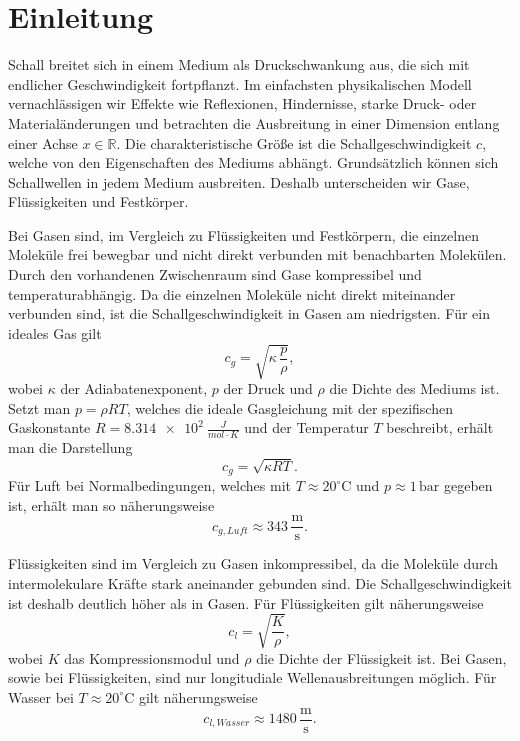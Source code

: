 %
%
%
%
\section{Einleitung\label{schall:section:teil0}}

Schall breitet sich in einem Medium als Druckschwankung aus, die sich mit endlicher Geschwindigkeit fortpflanzt.
Im einfachsten physikalischen Modell vernachlässigen wir Effekte wie Reflexionen, Hindernisse, starke Druck- oder Materialänderungen und betrachten die Ausbreitung in einer Dimension entlang einer Achse $x \in \mathbb{R}$.
Die charakteristische Größe ist die Schallgeschwindigkeit $c$, welche von den Eigenschaften des Mediums abhängt.
Grundsätzlich können sich Schallwellen in jedem Medium ausbreiten.
Deshalb unterscheiden wir Gase, Flüssigkeiten und Festkörper.

Bei Gasen sind, im Vergleich zu Flüssigkeiten und Festkörpern, die einzelnen Moleküle frei bewegbar und nicht direkt verbunden mit benachbarten Molekülen.
Durch den vorhandenen Zwischenraum sind Gase kompressibel und temperaturabhängig.
Da die einzelnen Moleküle nicht direkt miteinander verbunden sind, ist die Schallgeschwindigkeit in Gasen am niedrigsten.
Für ein ideales Gas gilt
\begin{equation}
    c_{g} = \sqrt{\kappa \, \frac{p}{\rho}},
\end{equation}
wobei $\kappa$ der Adiabatenexponent, $p$ der Druck und $\rho$ die Dichte des Mediums ist.
Setzt man $p = \rho R T$, welches die ideale Gasgleichung mit der spezifischen Gaskonstante $R = \SI{8.314e2}{\frac{J}{mol \cdot K}}$ und der Temperatur $T$ beschreibt, erhält man die Darstellung
\begin{equation}
    c_{g} = \sqrt{\kappa R T}.
\end{equation}
Für Luft bei Normalbedingungen, welches mit $T \approx 20^\circ \mathrm{C}$ und $p \approx 1\,\mathrm{bar}$ gegeben ist, erhält man so näherungsweise
\begin{equation}
    c_{g,Luft} \approx 343 \,\frac{\mathrm{m}}{\mathrm{s}}.
\end{equation}

Flüssigkeiten sind im Vergleich zu Gasen inkompressibel, da die Moleküle durch intermolekulare Kräfte stark aneinander gebunden sind.
Die Schallgeschwindigkeit ist deshalb deutlich höher als in Gasen.
Für Flüssigkeiten gilt näherungsweise
\begin{equation}
    c_{l} = \sqrt{\frac{K}{\rho}},
\end{equation}
wobei $K$ das Kompressionsmodul und $\rho$ die Dichte der Flüssigkeit ist.
Bei Gasen, sowie bei Flüssigkeiten, sind nur longitudiale Wellenausbreitungen möglich.
Für Wasser bei $T \approx 20^\circ \mathrm{C}$ gilt näherungsweise
\begin{equation}
    c_{l,Wasser} \approx 1480 \,\frac{\mathrm{m}}{\mathrm{s}}.
\end{equation}


